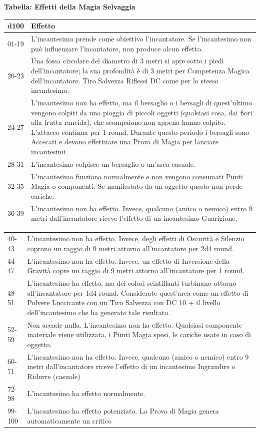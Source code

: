 \documentclass[a4paper,twoside,openany]{book}
\begin{document}
\begin{multicols}{2}
\medskip

\textbf{Tabella: Effetti della Magia Selvaggia}

\medskip

\noindent\begin{tabularx}{0.5\textwidth}{lX}
	d100&Effetto\\
	\toprule
	01-19&L'incantesimo prende come obiettivo l'incantatore. Se l'incantesimo non può influenzare l'incantatore, non produce alcun effetto.\\
	20-23&Una fossa circolare del diametro di 3 metri si apre sotto i piedi dell'incantatore; la sua profondità è di 3 metri per Competenza Magica dell'incantatore. Tiro Salvezza Riflessi DC come per lo stesso incantesimo.\\
	24-27&L'incantesimo non ha effetto, ma il bersaglio o i bersagli di quest'ultimo vengono colpiti da una pioggia di piccoli oggetti (qualsiasi cosa, dai fiori alla frutta rancida), che scompaiono non appena hanno colpito. L'attacco continua per 1 round. Durante questo periodo i bersagli sono Accecati e devono effettuare una Prova di Magia per lanciare incantesimi.\\
	28-31&L'incantesimo colpisce un bersaglio o un'area casuale.\\
	32-35&L'incantesimo funziona normalmente e non vengono consumati Punti Magia o componenti. Se manifestato da un oggetto questo non perde cariche.\\
	36-39&L'incantesimo non ha effetto. Invece, qualcuno (amico o nemico) entro 9 metri dall'incantatore riceve l'effetto di un incantesimo Guarigione.
\end{tabularx}
\noindent\begin{tabularx}{0.5\textwidth}{lX}
	40-43&L'incantesimo non ha effetto. Invece, degli effetti di Oscurità e Silenzio coprono un raggio di 9 metri attorno all'incantatore per 2d4 round.\\
	44-47&L'incantesimo non ha effetto. Invece, un effetto di Inversione della Gravità copre un raggio di 9 metri attorno all'incantatore per 1 round.\\
	48-51&L'incantesimo ha effetto, ma dei colori scintillanti turbinano attorno all'incantatore per 1d4 round. Considerate quest'area come un effetto di Polvere Luccicante con un Tiro Salvezza con DC 10 + il livello dell'incantesimo che ha generato tale risultato.\\
	52-59&Non accade nulla. L'incantesimo non ha effetto. Qualsiasi componente materiale viene utilizzata, i Punti Magia spesi, le cariche usate in caso di oggetto.\\
	60-71&L'incantesimo non ha effetto. Invece, qualcuno (amico o nemico) entro 9 metri dall'incantatore riceve l'effetto di un incantesimo Ingrandire o Ridurre (casuale)\\
	72-98&L'incantesimo ha effetto normalmente.\\
	99-100&L'incantesimo ha effetto potenziato. La Prova di Magia genera automaticamente un critico
\end{tabularx}


\end{multicols}
\end{document}
